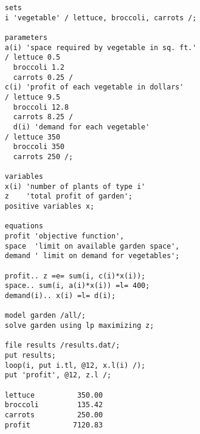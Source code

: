 \begin{enumerate}
\begin{solution}
\begin{Verbatim}
sets
i 'vegetable' / lettuce, broccoli, carrots /;

parameters
a(i) 'space required by vegetable in sq. ft.'
/ lettuce 0.5
  broccoli 1.2
  carrots 0.25 /
c(i) 'profit of each vegetable in dollars'
/ lettuce 9.5
  broccoli 12.8
  carrots 8.25 /
  d(i) 'demand for each vegetable'
/ lettuce 350
  broccoli 350
  carrots 250 /;

variables
x(i) 'number of plants of type i'
z    'total profit of garden';
positive variables x;

equations
profit 'objective function',
space  'limit on available garden space',
demand ' limit on demand for vegetables';

profit.. z =e= sum(i, c(i)*x(i));
space.. sum(i, a(i)*x(i)) =l= 400;
demand(i).. x(i) =l= d(i);

model garden /all/;
solve garden using lp maximizing z;

file results /results.dat/;
put results;
loop(i, put i.tl, @12, x.l(i) /);
put 'profit', @12, z.l /;

lettuce          350.00
broccoli         135.42
carrots          250.00
profit          7120.83
\end{Verbatim}
\end{solution}



\end{enumerate}
